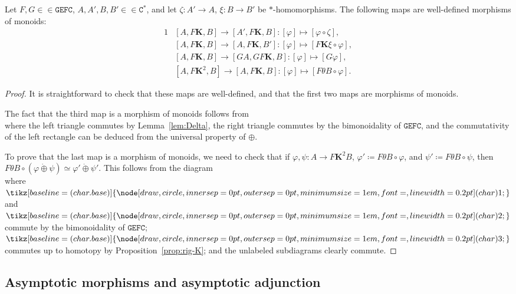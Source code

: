 \documentclass[10pt]{simplearticle}
\newcommand{\tikzinput}[1]{}
\newcommand{\tcbase}[1]{%
  \mathord{%
    \tikz[baseline=(char.base)]{
      \node[draw,circle,inner sep=0pt,outer sep=0pt,minimum size=1em,font=\small,line width=0.2pt] (char) {#1};
    }%
  }%
}
\newcommand{\GEFC}{\mathbb{\mathtt{GEFC}}}
\newcommand{\Cstar}{\mathtt{C^{*}}}
\newcommand{\tc}[1]{\tcbase{#1}}
\newcommand{\uu}{\dot{\oplus}}
\newcommand{\fK}{\mathbf{K}}
\begin{document}
\begin{lem}\label{lem:78}
Let $F,G\in\in\GEFC$, $A,A',B,B'\in\in\Cstar$, and
let $\zeta\colon A'\to A$, $\xi\colon B\to B'$ be $*$-homomorphisms.
The following maps are well-defined morphisms of monoids:
\begin{alignat*}{1}
 & [A,F\fK,B]\to[A',F\fK,B]\colon[\varphi]\mapsto[\varphi\circ\zeta],\\
 & [A,F\fK,B]\to[A,F\fK,B']\colon[\varphi]\mapsto[F\fK\xi\circ\varphi],\\
 & [A,F\fK,B]\to[GA,GF\fK,B]\colon[\varphi]\mapsto[G\varphi],\\
 & [A,F\fK^{2},B]\to[A,F\fK,B]\colon[\varphi]\mapsto[F\theta B\circ\varphi].
\end{alignat*}
\end{lem}

\begin{proof}
It is straightforward to check that these maps are well-defined, and
that the first two maps are morphisms of monoids.

The fact that the third map is a morphism of monoids follows from
\[
\tikzinput{d425}
\]
where the left triangle commutes by Lemma~\ref{lem:Delta}, the right
triangle commutes by the bimonoidality of $\GEFC$, and the commutativity
of the left rectangle can be deduced from the universal property of
$\oplus$.

To prove that the last map is a morphism of monoids, we need to check
that if $\varphi,\psi\colon A\to F\fK^{2}B$, $\varphi'\coloneqq F\theta B\circ\varphi$,
and $\psi'\coloneqq F\theta B\circ\psi$, then $F\theta B\circ(\varphi\uu\psi)\simeq\varphi'\uu\psi'$.
This follows from the diagram
\[
\tikzinput{d305}
\]
where $\tc 1$ and $\tc 2$ commute by the bimonoidality of $\GEFC$;
$\tc 3$ commutes up to homotopy by Proposition~\ref{prop:rig-K};
and the unlabeled subdiagrams clearly commute.
\end{proof}

\subsection{Asymptotic morphisms and asymptotic adjunction}
\end{document}
